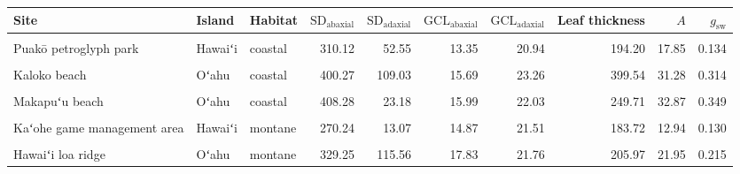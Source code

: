 \documentclass[
  letterpaper,
  DIV=11,
  numbers=noendperiod]{scrartcl}
\begin{document}
\begin{landscape}
\begin{longtable}{>{\raggedright\arraybackslash}p{4cm}>{\raggedright\arraybackslash}p{1.5cm}>{\raggedright\arraybackslash}p{1.5cm}rrrrrrr}
\toprule
Site & Island & Habitat & $\mathrm{SD}_\text{abaxial}$ & $\mathrm{SD}_\text{adaxial}$ & $\mathrm{GCL}_\text{abaxial}$ & $\mathrm{GCL}_\text{adaxial}$ & Leaf thickness & $A$ & $g_\text{sw}$\\
\midrule
\cellcolor{gray!6}{Kaloko-Honokōhau national historical park} & \cellcolor{gray!6}{Hawaiʻi} & \cellcolor{gray!6}{coastal} & \cellcolor{gray!6}{412.99} & \cellcolor{gray!6}{92.31} & \cellcolor{gray!6}{14.73} & \cellcolor{gray!6}{20.32} & \cellcolor{gray!6}{189.60} & \cellcolor{gray!6}{17.40} & \cellcolor{gray!6}{0.123}\\
Puakō petroglyph park & Hawaiʻi & coastal & 310.12 & 52.55 & 13.35 & 20.94 & 194.20 & 17.85 & 0.134\\
\cellcolor{gray!6}{Kahuku Point} & \cellcolor{gray!6}{Oʻahu} & \cellcolor{gray!6}{coastal} & \cellcolor{gray!6}{420.43} & \cellcolor{gray!6}{80.80} & \cellcolor{gray!6}{16.23} & \cellcolor{gray!6}{22.77} & \cellcolor{gray!6}{304.24} & \cellcolor{gray!6}{20.88} & \cellcolor{gray!6}{0.155}\\
Kaloko beach & Oʻahu & coastal & 400.27 & 109.03 & 15.69 & 23.26 & 399.54 & 31.28 & 0.314\\
\cellcolor{gray!6}{Kaʻena Point} & \cellcolor{gray!6}{Oʻahu} & \cellcolor{gray!6}{coastal} & \cellcolor{gray!6}{370.14} & \cellcolor{gray!6}{120.34} & \cellcolor{gray!6}{17.61} & \cellcolor{gray!6}{22.89} & \cellcolor{gray!6}{295.82} & \cellcolor{gray!6}{34.77} & \cellcolor{gray!6}{0.336}\\
\addlinespace
Makapuʻu beach & Oʻahu & coastal & 408.28 & 23.18 & 15.99 & 22.03 & 249.71 & 32.87 & 0.349\\
\cellcolor{gray!6}{Hāloa ʻĀina} & \cellcolor{gray!6}{Hawaiʻi} & \cellcolor{gray!6}{montane} & \cellcolor{gray!6}{307.94} & \cellcolor{gray!6}{7.61} & \cellcolor{gray!6}{16.49} & \cellcolor{gray!6}{22.59} & \cellcolor{gray!6}{149.41} & \cellcolor{gray!6}{13.07} & \cellcolor{gray!6}{0.116}\\
Kaʻohe game management area & Hawaiʻi & montane & 270.24 & 13.07 & 14.87 & 21.51 & 183.72 & 12.94 & 0.130\\
\cellcolor{gray!6}{Koaiʻa tree sanctuary} & \cellcolor{gray!6}{Hawaiʻi} & \cellcolor{gray!6}{montane} & \cellcolor{gray!6}{318.58} & \cellcolor{gray!6}{9.55} & \cellcolor{gray!6}{13.89} & \cellcolor{gray!6}{22.86} & \cellcolor{gray!6}{138.89} & \cellcolor{gray!6}{27.88} & \cellcolor{gray!6}{0.358}\\
Hawaiʻi loa ridge & Oʻahu & montane & 329.25 & 115.56 & 17.83 & 21.76 & 205.97 & 21.95 & 0.215\\

\end{longtable}
\end{landscape}
\end{document}

